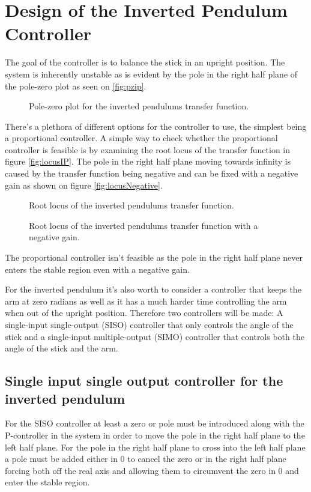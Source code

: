 \chapter{Design of the Inverted Pendulum Controller}\label{sec:IPController}
The goal of the controller is to balance the stick in an upright position. 
The system is inherently unstable as is evident by the pole in the right half plane of the pole-zero plot as seen on \autoref{fig:pzip}.

\begin{figure}[htbp]
\centering
\missingfigure{}
\caption{Pole-zero plot for the inverted pendulums transfer function.}
\label{fig:pzip}
\end{figure}

There's a plethora of different options for the controller to use, the simplest being a proportional controller. A simple way to check whether the proportional controller is feasible is by examining the root locus of the transfer function in figure \autoref{fig:locusIP}. The pole in the right half plane moving towards infinity is caused by the transfer function being negative and can be fixed with a negative gain as shown on figure \autoref{fig:locusNegative}.

\begin{figure}[htbp]
\centering
\missingfigure{}
\caption{Root locus of the inverted pendulums transfer function.}
\label{fig:locusIP}
\end{figure}

\begin{figure}[htbp]
\centering
\missingfigure{}
\caption{Root locus of the inverted pendulums transfer function with a negative gain.}
\label{fig:locusNegative}
\end{figure}

The proportional controller isn't feasible as the pole in the right half plane never enters the stable region even with a negative gain.

For the inverted pendulum it's also worth to consider a controller that keeps the arm at zero radians as well as it has a much harder time controlling the arm when out of the upright position. Therefore two controllers will be made: A single-input single-output (SISO) controller that only controls the angle of the stick and a single-input multiple-output (SIMO) controller that controls both the angle of the stick and the arm. 

\section{Single input single output controller for the inverted pendulum}
For the SISO controller at least a zero or pole must be introduced along with the P-controller in the system in order to move the pole in the right half plane to the left half plane. For the pole in the right half plane to cross into the left half plane a pole must be added either in 0 to cancel the zero or in the right half plane forcing both off the real axis and allowing them to circumvent the zero in 0 and enter the stable region.

